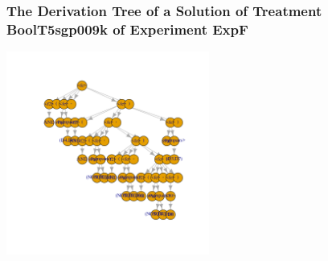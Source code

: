  \begin{frame}
 \frametitle{ The Derivation Tree of a Solution of Treatment BoolT5sgp009k of Experiment ExpF }
 \begin{center}
\includegraphics[width=0.5\textwidth, angle=0]
{ExpFDerivationTreeFigure007.pdf}
 \end{center}
 \label{templateReport/ExpFDerivationTreeFigure007.pdf}  
 \end{frame}

